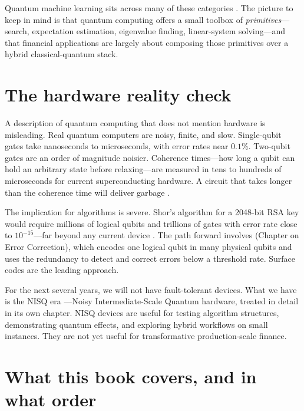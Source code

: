 Quantum machine learning sits across many of these categories \citep{biamonte_quantum_2017}. The picture to keep in mind is that quantum computing offers a small toolbox of \emph{primitives}---search, expectation estimation, eigenvalue finding, linear-system solving---and that financial applications are largely about composing those primitives over a hybrid classical-quantum stack.

\section{The hardware reality check}

A description of quantum computing that does not mention hardware is misleading. Real quantum computers are noisy, finite, and slow. Single-qubit gates take nanoseconds to microseconds, with error rates near $0.1\%$. Two-qubit gates are an order of magnitude noisier. Coherence times---how long a qubit can hold an arbitrary state before relaxing---are measured in tens to hundreds of microseconds for current superconducting hardware. A circuit that takes longer than the coherence time will deliver garbage \citep{preskill_quantum_2018}.

The implication for algorithms is severe. Shor's algorithm for a 2048-bit RSA key would require millions of logical qubits and trillions of gates with error rate close to $10^{-15}$---far beyond any current device \citep{nielsen_quantum_2010}. The path forward involves  (Chapter on Error Correction), which encodes one logical qubit in many physical qubits and uses the redundancy to detect and correct errors below a threshold rate. Surface codes \citep{fowler_surface_2012,kitaev_fault-tolerant_2003} are the leading approach.

For the next several years, we will not have fault-tolerant devices. What we have is the NISQ era \citep{preskill_quantum_2018}---Noisy Intermediate-Scale Quantum hardware, treated in detail in its own chapter. NISQ devices are useful for testing algorithm structures, demonstrating quantum effects, and exploring hybrid workflows on small instances. They are not yet useful for transformative production-scale finance.

\section{What this book covers, and in what order}

